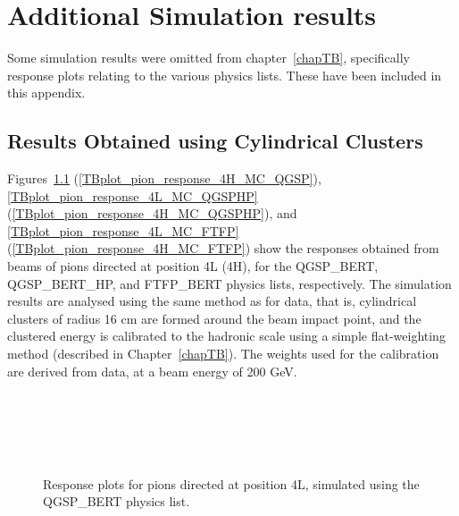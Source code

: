 \chapter{Additional Simulation results}
\label{appendix_MCresults}
Some simulation results were omitted from chapter~\ref{chapTB}, specifically response plots relating to the various physics lists. These have been included in this appendix.

\section{Results Obtained using Cylindrical Clusters}
Figures~\ref{TBplot_pion_response_4L_MC_QGSP} (\ref{TBplot_pion_response_4H_MC_QGSP}), \ref{TBplot_pion_response_4L_MC_QGSPHP} (\ref{TBplot_pion_response_4H_MC_QGSPHP}), and \ref{TBplot_pion_response_4L_MC_FTFP} (\ref{TBplot_pion_response_4H_MC_FTFP}) show the responses obtained from beams of pions directed at position 4L (4H), for the QGSP\_BERT, QGSP\_BERT\_HP, and FTFP\_BERT physics lists, respectively. The simulation results are analysed using the same method as for data, that is, cylindrical clusters of radius 16 cm are formed around the beam impact point, and the clustered energy is calibrated to the hadronic scale using a simple flat-weighting method (described in Chapter~\ref{chapTB}). The weights used for the calibration are derived from data, at a beam energy of 200 GeV.


\begin{figure}[p]
\begin{center}
\\
\\
\\
\\
\end{center}
\caption[Pions at 4L, QGSP\_BERT]{Response plots for pions directed at position 4L, simulated using the QGSP\_BERT physics list.}
\label{TBplot_pion_response_4L_MC_QGSP}
\end{figure}

